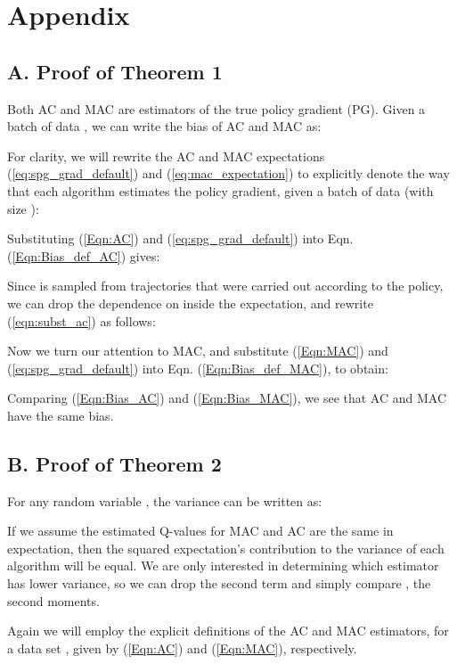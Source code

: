 \documentclass[letterpaper]{article}
\begin{document}



\onecolumn
\section{Appendix}
{
\setlength{\parindent}{0pt}
\setlength{\parskip}{8pt}
\raggedbottom

\subsection{A. Proof of Theorem 1}
\label{Proof:Theorem2}
Both AC and MAC are estimators of the true policy gradient (PG). Given a batch of data , we can write the bias of AC and MAC as:

For clarity, we will rewrite the AC and MAC expectations (\ref{eq:spg_grad_default}) and (\ref{eq:mac_expectation}) to explicitly denote the way that each algorithm estimates the policy gradient, given a batch of data  (with size ):

Substituting (\ref{Eqn:AC}) and (\ref{eq:spg_grad_default}) into Eqn. (\ref{Eqn:Bias_def_AC}) gives:

Since  is sampled from trajectories that were carried out according to the policy, we can drop the dependence on  inside the expectation, and rewrite (\ref{eqn:subst_ac}) as follows:

Now we turn our attention to MAC, and substitute (\ref{Eqn:MAC}) and (\ref{eq:spg_grad_default}) into Eqn. (\ref{Eqn:Bias_def_MAC}), to obtain:

Comparing (\ref{Eqn:Bias_AC}) and (\ref{Eqn:Bias_MAC}), we see that AC and MAC have the same bias.

\subsection{B. Proof of Theorem 2}
\label{Proof:Theorem3}
For any random variable , the variance  can be written as:


If we assume the estimated Q-values for MAC and AC are the same in expectation, then the squared expectation's contribution to the variance of each algorithm will be equal. We are only interested in determining which estimator has lower variance, so we can drop the second term and simply compare , the second moments.

Again we will employ the explicit definitions of the AC and MAC estimators, for a data set , given by (\ref{Eqn:AC}) and (\ref{Eqn:MAC}), respectively.

}
\end{document}
